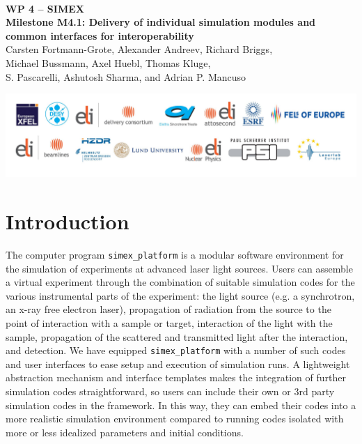 \documentclass[12pt]{scrartcl}
\begin{document}
\makeatletter
\begin{titlepage}
\thispagestyle{scrheadings}
\begin{center}
$~$\\
\vspace{2cm}
\Huge{\textbf{WP 4 -- SIMEX\\[1cm]
Milestone M4.1: Delivery of individual simulation modules and common interfaces
for interoperability}}\\[5mm]
\vspace{2cm}
\large{
Carsten Fortmann-Grote, Alexander Andreev, Richard Briggs,\\ Michael Bussmann,
  Axel Huebl, Thomas Kluge,\\
 S. Pascarelli, Ashutosh Sharma, and Adrian P. Mancuso\\
 }
\vspace{1cm}
\@date
\end{center}
\vfill%
\includegraphics[width=\textwidth]{PartnerLogos.pdf}
\normalfont
\end{titlepage}
\makeatother
%
\tableofcontents
%
\newpage
%
\section{Introduction}
The computer program \texttt{simex\_platform} \cite{simex_github} is a modular
software environment for the simulation of experiments at advanced laser light
sources. Users can assemble a virtual experiment through the combination
of suitable simulation codes for the various instrumental parts of the
experiment: the light source (e.g. a synchrotron, an x-ray free
electron laser), propagation of radiation from the source to the
point of interaction with a sample or target, interaction of the light with the sample,
propagation of the scattered and transmitted light after the
interaction, and detection. We have equipped \texttt{simex\_platform}
with a number of such codes and user interfaces to ease setup and execution of
simulation runs. A lightweight abstraction mechanism and interface templates
makes the integration of further simulation codes straightforward, so users can
include their own or 3rd party simulation codes in the framework.
In this way, they can embed their codes
into a more realistic simulation environment compared to running codes isolated
with more or less idealized parameters and initial conditions.
\end{document}
